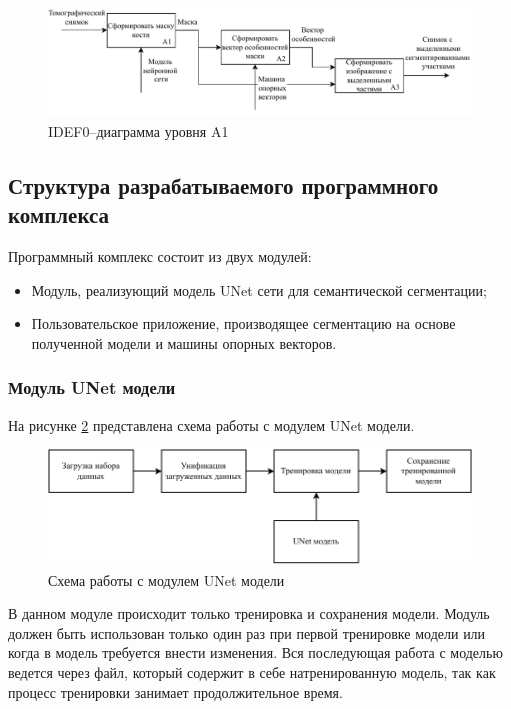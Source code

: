 \begin{figure}[H]
	\centering
	\includegraphics[width=\textwidth]{img/idef01.pdf}
	\caption{IDEF0--диаграмма уровня A1}
	\label{fig:idef01}
\end{figure}

\subsection{Структура разрабатываемого программного комплекса}

Программный комплекс состоит из двух модулей:
\begin{itemize}
	\item Модуль, реализующий модель UNet сети для семантической сегментации;
	\item Пользовательское приложение, производящее сегментацию на основе полученной модели и машины опорных векторов.
\end{itemize}

\subsubsection{Модуль UNet модели}

На рисунке \ref{fig:appunet} представлена схема работы с модулем UNet модели.

\begin{figure}[H]
	\centering
	\includegraphics[width=\textwidth]{img/appunet.pdf}
	\caption{Схема работы с модулем UNet модели}
	\label{fig:appunet}
\end{figure}

В данном модуле происходит только тренировка и сохранения модели. Модуль должен быть использован только один раз при первой тренировке модели или когда в модель требуется внести изменения. Вся последующая работа с моделью ведется через файл, который содержит в себе натренированную модель, так как процесс тренировки занимает продолжительное время.


